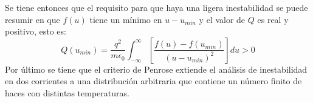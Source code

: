 \documentclass[../tesis_main_file.tex]{subfiles}
\begin{document}
Se tiene entonces que el requisito para que haya una ligera inestabilidad se puede resumir en que $f(u)$ tiene un mínimo en  $u-u_{min}$ y el valor de $Q$ es real y positivo, esto es:
\begin{equation}
\label{eq:criterio_Penrose}
Q(u_{min})=\frac{q^2}{m\epsilon _0}\int ^{\infty}_{-\infty}\left[\frac{f(u)-f(u_{min})}{(u-u_{min})^2}\right]du > 0
\end{equation}
Por último se tiene que el criterio de Penrose extiende el análisis de inestabilidad en dos corrientes a una distribución arbitraria que contiene un número finito de haces con distintas temperaturas.
%
\end{document}
